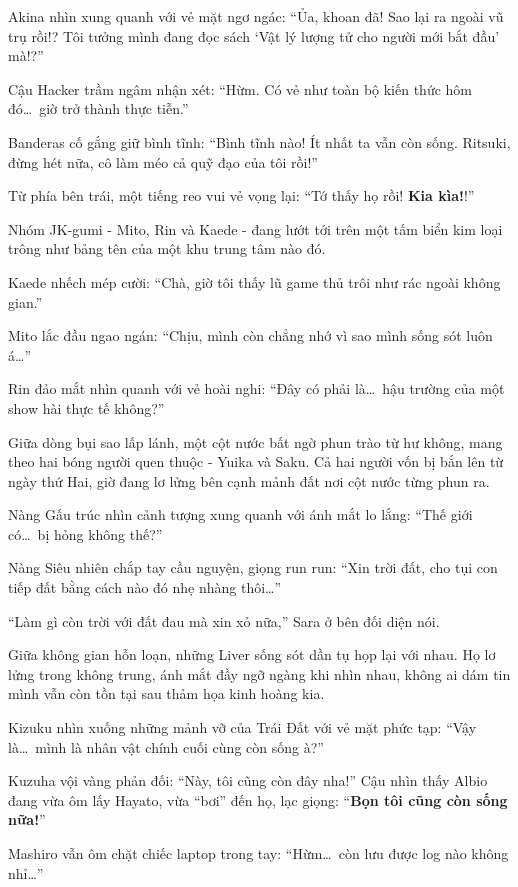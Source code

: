 \documentclass[../main.tex]{subfiles}
\begin{document}
Akina nhìn xung quanh với vẻ mặt ngơ ngác: ``Ủa, khoan đã! Sao lại ra ngoài vũ trụ rồi!? Tôi tưởng mình đang đọc sách `Vật lý lượng tử cho người mới bắt đầu' mà!?''

Cậu Hacker trầm ngâm nhận xét: ``Hừm. Có vẻ như toàn bộ kiến thức hôm đó\dots\ giờ trở thành thực tiễn.''

Banderas cố gắng giữ bình tĩnh: ``Bình tĩnh nào! Ít nhất ta vẫn còn sống. Ritsuki, đừng hét nữa, cô làm méo cả quỹ đạo của tôi rồi!''

Từ phía bên trái, một tiếng reo vui vẻ vọng lại: ``Tớ thấy họ rồi! \textbf{Kia kìa!}!''

Nhóm JK-gumi - Mito, Rin và Kaede - đang lướt tới trên một tấm biển kim loại trông như bảng tên của một khu trung tâm nào đó.

Kaede nhếch mép cười: ``Chà, giờ tôi thấy lũ game thủ trôi như rác ngoài không gian.''

Mito lắc đầu ngao ngán: ``Chịu, mình còn chẳng nhớ vì sao mình sống sót luôn á\dots''

Rin đảo mắt nhìn quanh với vẻ hoài nghi: ``Đây có phải là\dots\ hậu trường của một show hài thực tế không?''

Giữa dòng bụi sao lấp lánh, một cột nước bất ngờ phun trào từ hư không, mang theo hai bóng người quen thuộc - Yuika và Saku. Cả hai người vốn bị bắn lên từ ngày thứ Hai, giờ đang lơ lửng bên cạnh mảnh đất nơi cột nước từng phun ra.

Nàng Gấu trúc nhìn cảnh tượng xung quanh với ánh mắt lo lắng: ``Thế giới có\dots\ bị hỏng không thế?''

Nàng Siêu nhiên chắp tay cầu nguyện, giọng run run: ``Xin trời đất, cho tụi con tiếp đất bằng cách nào đó nhẹ nhàng thôi\dots''

``Làm gì còn trời với đất đau mà xin xỏ nữa,'' Sara ở bên đối diện nói.

Giữa không gian hỗn loạn, những Liver sống sót dần tụ họp lại với nhau. Họ lơ lửng trong không trung, ánh mắt đầy ngỡ ngàng khi nhìn nhau, không ai dám tin mình vẫn còn tồn tại sau thảm họa kinh hoàng kia.

Kizuku nhìn xuống những mảnh vỡ của Trái Đất với vẻ mặt phức tạp: ``Vậy là\dots\ mình là nhân vật chính cuối cùng còn sống à?''

Kuzuha vội vàng phản đối: ``Này, tôi cũng còn đây nha!'' Cậu nhìn thấy Albio đang vừa ôm lấy Hayato, vừa ``bơi'' đến họ, lạc giọng: ``\textbf{Bọn tôi cũng còn sống nữa!}''

Mashiro vẫn ôm chặt chiếc laptop trong tay: ``Hừm\dots\ còn lưu được log nào không nhỉ\dots''
\end{document}
